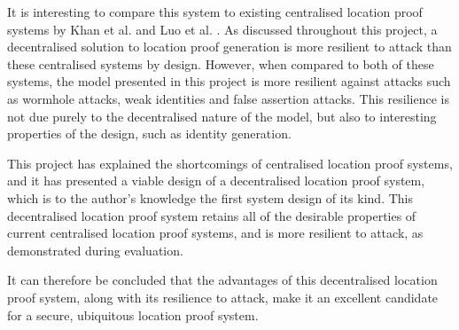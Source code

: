 It is interesting to compare this system to existing centralised location proof systems by Khan et al. \cite{khan} and Luo et al. \cite{luo}. As discussed throughout this project, a decentralised solution to location proof generation is more resilient to attack than these centralised systems by design. However, when compared to both of these systems, the model presented in this project is more resilient against attacks such as wormhole attacks, weak identities and false assertion attacks. This resilience is not due purely to the decentralised nature of the model, but also to interesting properties of the design, such as identity generation.

This project has explained the shortcomings of centralised location proof systems, and it has presented a viable design of a decentralised location proof system, which is to the author's knowledge the first system design of its kind. This decentralised location proof system retains all of the desirable properties of current centralised location proof systems, and is more resilient to attack, as demonstrated during evaluation.

It can therefore be concluded that the advantages of this decentralised location proof system, along with its resilience to attack, make it an excellent candidate for a secure, ubiquitous location proof system.